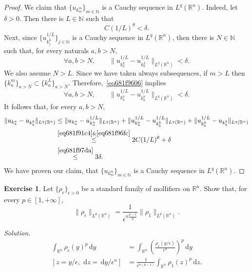 \documentclass[a4paper,9pt]{amsart}
\newcommand{\N}{\mathbb{N}}	%
\newcommand{\R}{\mathbb{R}}	%
\newcommand{\did}{\,\mathrm{d}}	%
\theoremstyle{plain}
\theoremstyle{definition}
\newtheorem{exercise}[proposition]{Exercise}%
\theoremstyle{remark}
\begin{document}
\begin{proof}
	We claim that $\{u_{k^m_m}\}_{m\in\N}$ is a Cauchy sequence in $L^q(\R^n)$.
	Indeed, let $\delta>0$.
	Then there is $L\in\N$ such that 
	\begin{equation}\label{eq681f97da}
		C(1/L)^\theta < \delta .
	\end{equation}
	Next, since $\{u_{k^L_j}^{1/L}\}_{j\in\N}$ is a Cauchy sequence in $L^q(\R^n)$,
	then there is $N\in\N$ such that, for every naturals $a,b>N$,
	\begin{equation}\label{eq681f9606}
		\forall a,b>N,\qquad
		\|u_{k^L_a}^{1/L} - u_{k^L_b}^{1/L}\|_{L^q(\R^n)} < \delta.
	\end{equation}
	We also assume $N>L$.
	Since we have taken always subsequences, if $m>L$ then 
	$\{k_a^m\}_{a>N} \subset \{k_a^L\}_{a>N}$.
	Therefore,~\eqref{eq681f9606} implies
	\begin{equation}\label{eq681f96fc}
		\forall a,b>N,\qquad
		\|u_{k^a_a}^{1/L} - u_{k^b_b}^{1/L}\|_{L^q(\R^n)} < \delta.
	\end{equation}
	It follows that, for every $a,b>N$,
	\begin{align}
		\|u_{k^a_a} - u_{k^b_b}\|_{L^q(\R^n)}
		&\le \|u_{k^a_a} - u_{k^a_a}^{1/L} \|_{L^q(\R^n)}
			+ \| u_{k^a_a}^{1/L} - u_{k^b_b}^{1/L} \|_{L^q(\R^n)}
			+ \| u_{k^b_b}^{1/L} - u_{k^b_b} \|_{L^q(\R^n)} \\
		&\overset{\eqref{eq681f91c4}\&\eqref{eq681f96fc}}\le 2C(1/L)^\theta + \delta \\
		&\overset{\eqref{eq681f97da}}\le 3\delta .
	\end{align}
	We have proven our claim, that $\{u_{k^m_m}\}_{m\in\N}$ is a Cauchy sequence in $L^q(\R^n)$.
\end{proof}

\begin{exercise}
	Let $\{\rho_\epsilon\}_{\epsilon>0}$ be a standard family of mollifiers on $\R^n$.
	Show that, for every $p\in[1,+\infty]$,
	\begin{equation}\label{eq681f83e0}
		\|\rho_\epsilon\|_{L^p(\R^n)} = \frac1{\epsilon^{n\frac{p-1}{p}}} \|\rho_1\|_{L^p(\R^n)} .
	\end{equation}
	
	{\it Solution.}
	\begin{align}
		\int_{\R^n} \rho_\epsilon(y)^p \did y
		&= \int_{\R^n} \left( \frac{\rho_1(y/\epsilon)}{\epsilon^n} \right)^p \did y \\
		[z=y/\epsilon,\ \did z = \did y/\epsilon^n]
		&= \frac{1}{\epsilon^{n(p-1)}} \int_{\R^n} \rho_1(z)^p \did z .
	\end{align}
\end{exercise}
\end{document}
